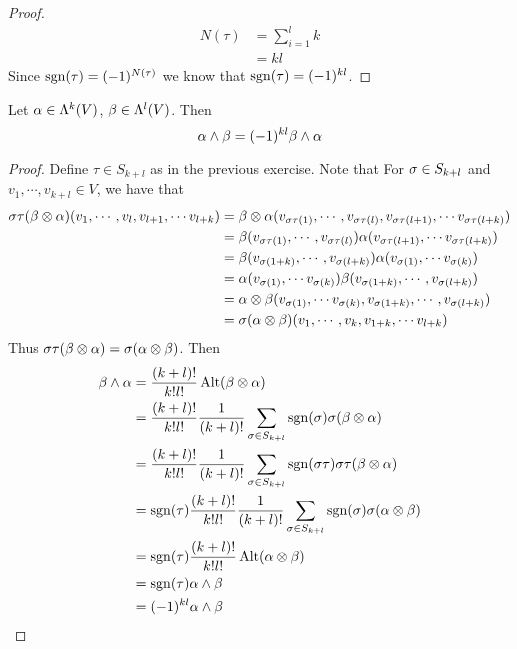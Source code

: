 \documentclass{book}
\begin{document}
	\begin{proof}
		\begin{align*}
			N(\tau) 
			&= \sum_{i = 1}^l k \\
			&= kl
		\end{align*}
		Since $\operatorname{sgn} (\tau) = (-1)^{N(\tau)}$ we know that  $\operatorname{sgn}(\tau) = (-1)^{kl}$.
	\end{proof}

	
	\begin{ex}
		Let $\alpha \in \Lambda^k(V)$, $\beta \in \Lambda^l(V)$. Then $$\alpha \wedge \beta = (-1)^{kl}\beta \wedge \alpha$$
	\end{ex}

	\begin{proof}
		Define $\tau \in S_{k+l}$ as in the previous exercise. Note that For $\sigma \in S_{k+l}$ and $v_1, \cdots, v_{k +l} \in V$, we have that 
		\begin{align*}
			\sigma \tau (\beta \otimes \alpha)(v_1, \cdots, v_l, v_{l+1}, \cdots v_{l+k}) 
			&= \beta \otimes \alpha(v_{\sigma \tau(1)}, \cdots, v_{\sigma \tau(l)}, v_{\sigma \tau(l+1)}, \cdots v_{\sigma \tau(l+k)}) \\
			&= \beta(v_{\sigma \tau(1)}, \cdots, v_{\sigma \tau(l)}) \alpha(v_{\sigma \tau(l+1)}, \cdots v_{\sigma \tau(l+k)}) \\
			&= \beta(v_{\sigma (1+k)}, \cdots, v_{\sigma (l+k)}) \alpha(v_{\sigma (1)}, \cdots v_{\sigma (k)})\\ 
			&= \alpha(v_{\sigma (1)}, \cdots v_{\sigma (k)}) \beta(v_{\sigma (1+k)}, \cdots, v_{\sigma (l+k)}) \\
			&= \alpha \otimes \beta (v_{\sigma (1)}, \cdots v_{\sigma (k)}, v_{\sigma (1+k)}, \cdots, v_{\sigma (l+k)}) \\
			&= \sigma (\alpha \otimes \beta) (v_1, \cdots, v_k, v_{1+k}, \cdots v_{l+k})
		\end{align*}
		Thus $\sigma \tau (\beta \otimes \alpha) = \sigma (\alpha \otimes \beta)$. Then 
		\begin{align*}
			\beta \wedge \alpha
			&= \frac{(k+l)!}{k!l!}\operatorname{Alt}(\beta \otimes \alpha) \\
			&=  \frac{(k+l)!}{k!l!} \frac{1}{(k+l)!} \sum_{\sigma \in S_{k+l}} \operatorname{sgn}(\sigma) \sigma (\beta \otimes \alpha) \\
			&= \frac{(k+l)!}{k!l!} \frac{1}{(k+l)!} \sum_{\sigma \in S_{k+l}} \operatorname{sgn}(\sigma \tau) \sigma \tau (\beta \otimes \alpha) \\
			&= \operatorname{sgn}(\tau)\frac{(k+l)!}{k!l!} \frac{1}{(k+l)!} \sum_{\sigma \in S_{k+l}} \operatorname{sgn}(\sigma) \sigma (\alpha \otimes \beta) \\
			&= \operatorname{sgn}(\tau)\frac{(k+l)!}{k!l!}  \operatorname{Alt}(\alpha \otimes \beta) \\
			&= \operatorname{sgn}(\tau) \alpha \wedge \beta \\
			&= (-1)^{kl} \alpha \wedge \beta
		\end{align*}
	 
	\end{proof}
\end{document}
